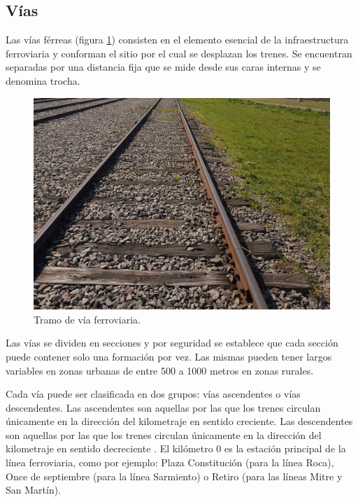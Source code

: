 		\subsection{Vías}
			
			Las vías férreas (figura \ref{fig:Via_eclisa}) consisten en el elemento esencial de la infraestructura ferroviaria y conforman el sitio por el cual se desplazan los trenes. Se encuentran separadas por una distancia fija que se mide desde sus caras internas y se denomina trocha.
			
			\begin{figure}[htbp!]
				\centering
				\includegraphics[scale=.07]{./Figures/Tramo_via}
				\caption{Tramo de vía ferroviaria.}
				\label{fig:Via_eclisa}
			\end{figure}	
			
			
			Las vías se dividen en secciones y por seguridad se establece que cada sección puede contener solo una formación por vez. Las mismas pueden tener largos variables en zonas urbanas de entre 500 a 1000 metros en zonas rurales. 
			
			Cada vía puede ser clasificada en dos grupos: vías ascendentes o vías descendentes. Las ascendentes son aquellas por las que los trenes circulan únicamente en la dirección del kilometraje en sentido creciente. Las descendentes son aquellas por las que los trenes circulan únicamente en la dirección del kilometraje en sentido decreciente \cite{RITO}. El kilómetro 0 es la estación principal de la línea ferroviaria, como por ejemplo: Plaza Constitución (para la línea Roca), Once de septiembre (para la línea Sarmiento) o Retiro (para las líneas Mitre y San Martín).
			
